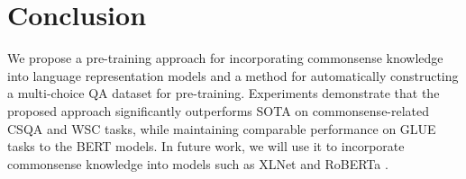 \documentclass[11pt,a4paper]{article}
\begin{document}
\section{Conclusion}
We propose a pre-training approach for incorporating commonsense knowledge into language representation models and a method for automatically constructing a multi-choice QA dataset for pre-training.  Experiments demonstrate that the proposed approach significantly outperforms SOTA on commonsense-related CSQA and WSC tasks, while maintaining comparable performance on GLUE tasks to the BERT models. In future work, we will use it to incorporate commonsense knowledge into models such as XLNet \citep{yang2019xlnet} and RoBERTa \citep{liu2019roberta}.




\end{document}

